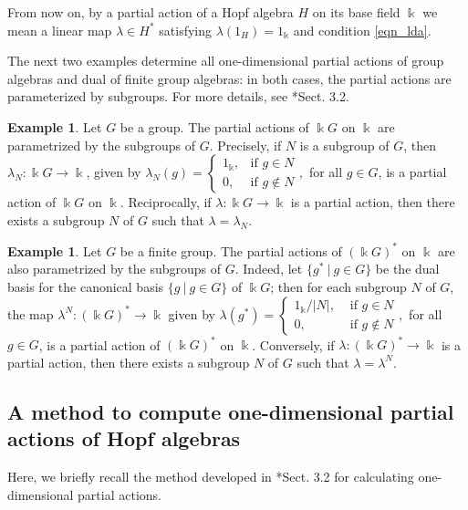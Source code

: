 \documentclass[reqno]{amsart}
\theoremstyle{definition}
\newtheorem{exa}[thm]{Example}
\numberwithin{equation}{section}\theoremstyle{plain}
\theoremstyle{definition}
\def \k {\Bbbk}
\begin{document}
\medbreak

From now on, by a partial action of a Hopf algebra $H$ on its base field $\k$ we mean a linear map $\lambda\in H^*$ satisfying $\lambda(1_H)=1_\k$ and condition \eqref{eqn_lda}.

\medbreak

The next two examples determine all one-dimensional partial actions of group algebras and dual of finite group algebras:
in both cases, the partial actions are parameterized by subgroups.
For more details, see \cite{Alvares_Alves_Batista}*{Sect. 3.2}.

\begin{exa}\label{exemplo_parcialgrupo} Let $G$ be a group. 
The partial actions of $\k G$ on $\k$ are parametrized by the subgroups of $G$.
Precisely, if $N$ is a subgroup of $G$, then  $\lambda_N: \k G \longrightarrow \k$, given by $\lambda_N (g) = \begin{cases}
	1_\k, & \textrm{if } g \in N \\ 0, & \textrm{if } g \notin N\end{cases},$
	for all $g \in G$, is a partial action of $\Bbbk G$ on $\Bbbk$.
Reciprocally, if $\lambda: \Bbbk G \rightarrow \Bbbk$ is a partial action, then there exists a subgroup $N$ of $G$ such that $\lambda = \lambda_N$.
\end{exa}

\begin{exa}\label{exemplo_parcialdualgrupo}
	Let $G$ be a finite group.
	The partial actions of $(\k G)^*$ on $\k$ are also parametrized by the subgroups of $G$.
	Indeed, let $\{g^* \ | \ g \in G\}$ be the dual basis for the canonical basis $\{g \ | \ g \in G\}$ of $\k G$; then for each subgroup $N$ of $G$, the map $\lambda^N : (\k G)^* \longrightarrow \k$ given by
	$\lambda (g^*) = \begin{cases}
	1_\k / |N|, & \textrm{ if } g \in N \\ 0, & \textrm{ if } g \notin N\end{cases},$
	for all $g \in G$, is a partial action of $(\Bbbk G)^\ast$ on $\Bbbk$.
    Conversely, if $\lambda: (\Bbbk G)^\ast \rightarrow \Bbbk$ is a partial action, then there exists a subgroup $N$ of $G$ such that $\lambda = \lambda^N$.
\end{exa}

\subsection{A method to compute one-dimensional partial actions of Hopf algebras}\label{subsec_method}
Here, we briefly recall the method developed in \cite{corresponding}*{Sect. 3.2} for calculating one-dimensional partial actions.
\end{document}
